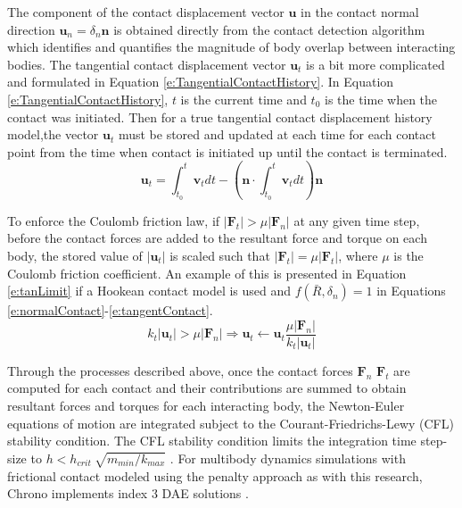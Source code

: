 \documentclass[12pt,onecolumn]{report}
\begin{document}
The component of the contact displacement vector $\boldsymbol{u}$ in the contact normal direction $\boldsymbol{u}_n = \delta_n \boldsymbol{n}$ is obtained directly from the contact detection algorithm which identifies and quantifies the magnitude of body overlap between interacting bodies. The tangential contact displacement vector $\boldsymbol{u}_t$ is a bit more complicated and formulated in Equation \ref{e:TangentialContactHistory}. In Equation \ref{e:TangentialContactHistory}, $t$ is the current time and $t_0$ is the time when the contact was initiated. Then for a true tangential contact displacement history model,the vector $\boldsymbol{u}_t$ must be stored and updated at each time for each contact point from the time when contact is initiated up until the contact is terminated. 
%
\begin{equation}\label{e:TangentialContactHistory}
\boldsymbol{u}_t = \int_{t_0}^{t}\boldsymbol{v}_t dt - \left( \boldsymbol{n}\cdot  \int_{t_0}^{t}\boldsymbol{v}_t dt \right)  \boldsymbol{n}
\end{equation}

To enforce the Coulomb friction law, if $\lvert \boldsymbol{F}_t \rvert > \mu\lvert \boldsymbol{F}_n \rvert$ at any given time step, before the contact forces are added to the resultant force and torque on each body, the stored value of $\lvert\boldsymbol{u}_t\rvert$ is scaled such that $\lvert \boldsymbol{F}_t \rvert = \mu\lvert \boldsymbol{F}_t \rvert$, where $\mu$ is the Coulomb friction coefficient. An example of this is presented in Equation \ref{e:tanLimit} if a Hookean contact model is used and $ f\left(\bar{R},\delta_n\right) = 1$ in Equations \ref{e:normalContact}-\ref{e:tangentContact}.
%
\begin{equation}\label{e:tanLimit}
k_t\lvert \boldsymbol{u}_t \rvert > \mu\lvert \boldsymbol{F}_n \rvert  \Rightarrow \boldsymbol{u}_t \leftarrow \boldsymbol{u}_t \frac{\mu\lvert \boldsymbol{F}_n \rvert}{k_t\lvert \boldsymbol{u}_t \rvert}
\end{equation}

Through the processes described above, once the contact forces $\boldsymbol{F}_n$ $\boldsymbol{F}_t$ are computed for each contact and their contributions are summed to obtain resultant forces and torques for each interacting body, the Newton-Euler equations of motion are integrated subject to the Courant-Friedrichs-Lewy (CFL) stability condition. The CFL stability condition limits the integration time step-size to $h<h_{crit} ~ \sqrt{m_{min} / k_{max}}$  \cite{OSullivan&Bray2004}. For multibody dynamics simulations with frictional contact modeled using the penalty approach as with this research, Chrono implements index 3 DAE solutions \cite{Chrono2016}.
\end{document}
